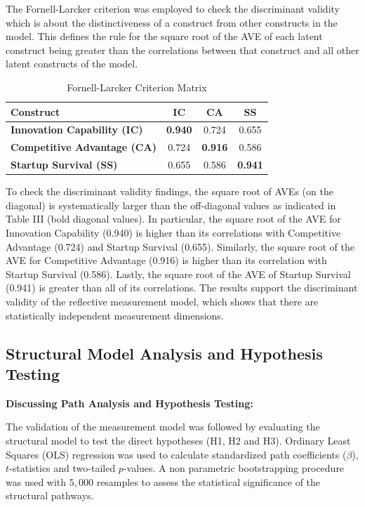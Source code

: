 \documentclass{ieeeaccess}
\begin{document}
The Fornell-Larcker criterion was employed to check the discriminant validity which is about the distinctiveness of a construct from other constructs in the model. This defines the rule for the square root of the AVE of each latent construct being greater than the correlations between that construct and all other latent constructs of the model.

\begin{table}[htbp]
\caption{Fornell-Larcker Criterion Matrix}
\label{tab:fornell_larcker}
\centering
\begin{tabular}{lccc}
\hline
\textbf{Construct} &
\textbf{IC} &
\textbf{CA} &
\textbf{SS} \\
\hline

\textbf{Innovation Capability (IC)}
& \textbf{0.940}
& 0.724
& 0.655 \\

\textbf{Competitive Advantage (CA)}
& 0.724
& \textbf{0.916}
& 0.586 \\

\textbf{Startup Survival (SS)}
& 0.655
& 0.586
& \textbf{0.941} \\
\hline
\end{tabular}
\end{table}

To check the discriminant validity findings, the square root of AVEs (on the diagonal) is systematically larger than the off-diagonal values as indicated in Table III (bold diagonal values). In particular, the square root of the AVE for Innovation Capability (0.940) is higher than its correlations with Competitive Advantage (0.724) and Startup Survival (0.655). Similarly, the square root of the AVE for Competitive Advantage (0.916) is higher than its correlation with Startup Survival (0.586). Lastly, the square root of the AVE of Startup Survival (0.941) is greater than all of its correlations. The results support the discriminant validity of the reflective measurement model, which shows that there are statistically independent measurement dimensions.


\subsection{Structural Model Analysis and Hypothesis Testing}

\textbf{Discussing Path Analysis and Hypothesis Testing:}

The validation of the measurement model was followed by evaluating the structural model to test the direct hypotheses (H1, H2 and H3). Ordinary Least Squares (OLS) regression was used to calculate standardized path coefficients ($\beta$), $t$-statistics and two-tailed $p$-values. A non parametric bootstrapping procedure was used with $5,000$ resamples to assess the statistical significance of the structural pathways.
\end{document}
